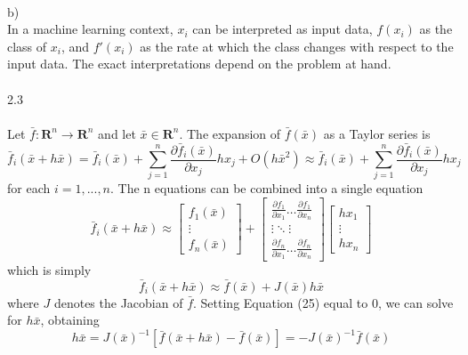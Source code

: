 \documentclass[10pt]{article}
\begin{document}
\\
b)\\
In a machine learning context, $x_{i}$ can be interpreted as input data, $f(x_{i})$ as the class of $x_{i}$, and $f'(x_{i})$ as the rate at which the class changes with respect to the input data. The exact interpretations depend on the problem at hand.\\
\\
2.3\\
\\
Let $\bar{f}: \mathbf{R}^n \to \mathbf{R}^n$ and let $\bar{x} \in \mathbf{R}^n$. The expansion of $\bar{f}(\bar{x})$ as a Taylor series is
\begin{equation}
\bar{f}_{i}(\bar{x}+h\bar{x})=\bar{f}_{i}(\bar{x})+\sum\limits_{j=1}^n \frac{\partial \bar{f}_{i}(\bar{x})}{\partial x_{j}} h x_{j} + O(h \bar{x}^2) \approx \bar{f}_{i}(\bar{x})+\sum\limits_{j=1}^n \frac{\partial \bar{f}_{i}(\bar{x})}{\partial x_{j}} h x_{j}
\end{equation}
for each $i=1,...,n$. The n equations can be combined into a single equation
\begin{equation}
\bar{f}_{i}(\bar{x}+h\bar{x})\approx 
\begin{bmatrix}
f_{1}(\bar{x})\\
\vdots\\
f_{n}(\bar{x})
\end{bmatrix}
+
\begin{bmatrix}
\frac{\partial f_{1}}{\partial x_{1}} \dots \frac{\partial f_{1}}{\partial x_{n}}\\
\vdots \ddots \vdots\\
\frac{\partial f_{n}}{\partial x_{1}} \dots \frac{\partial f_{n}}{\partial x_{n}}
\end{bmatrix}
\begin{bmatrix}
h x_{1}\\
\vdots\\
h x_{n}
\end{bmatrix}
\end{equation}
which is simply
\begin{equation}
\bar{f}_{i}(\bar{x}+h\bar{x})\approx \bar{f}(\bar{x}) + J(\bar{x})h\bar{x}
\end{equation}
where $J$ denotes the Jacobian of $\bar{f}$. Setting Equation (25) equal to 0, we can solve for $h \bar{x}$, obtaining
\begin{equation}
h \bar{x} = J(\bar{x})^{-1}[\bar{f}(\bar{x}+h\bar{x})-\bar{f}(\bar{x})]=-J(\bar{x})^{-1}\bar{f}(\bar{x})
\end{equation} 
\end{document}
